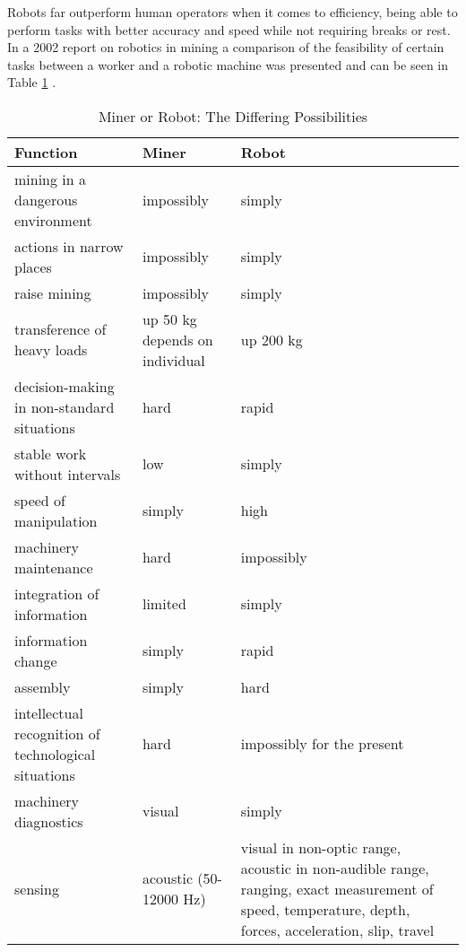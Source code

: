 Robots far outperform human operators when it comes to efficiency, being able to perform tasks with better accuracy and speed while not requiring breaks or rest. In a 2002 report on robotics in mining a comparison of the feasibility of certain tasks between a worker and a robotic machine was presented and can be seen in Table \ref{tab:table} \cite{table}.\\
\begin{center}
\begin{table}[ht!]
\caption[]{Miner or Robot: The Differing Possibilities \cite{table}}
\small
\hfill{}
\begin{adjustbox}{max width=\textwidth}
\begin{tabular}{p{3in} p{2.5in} p{2in} p{3in}}
\toprule
Function & Miner & Robot\\
\midrule
mining in a dangerous environment & impossibly & simply\\
actions in narrow places & impossibly & simply\\
raise mining & impossibly & simply\\
transference of heavy loads & up 50 kg depends on individual & up 200 kg\\
decision-making in non-standard situations & hard & rapid\\
stable work without intervals & low & simply\\
speed of manipulation & simply & high\\
machinery maintenance & hard & impossibly\\
integration of information & limited & simply\\
information change & simply & rapid\\
assembly & simply & hard\\
intellectual recognition of technological situations & hard & impossibly for the present\\
machinery diagnostics & visual & simply\\
sensing & acoustic (50-12000 Hz) & visual in non-optic range, acoustic in non-audible range, ranging, exact measurement of speed, temperature, depth, forces, acceleration, slip, travel\\
\bottomrule
\end{tabular}
\end{adjustbox}
\hfill{}
\label{tab:table}
\end{table}
\end{center}
